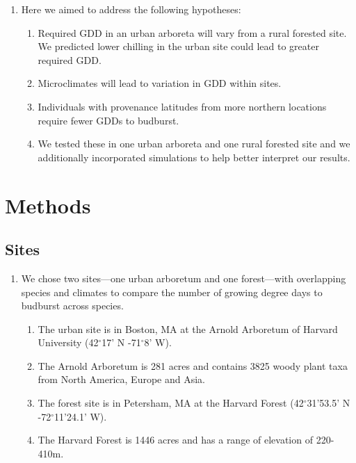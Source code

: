 \documentclass{article}\usepackage[]{graphicx}\usepackage[]{color}
\begin{document}
\begin{enumerate}
\item Here we aimed to address the following hypotheses:
  \begin{enumerate} 
  \item Required GDD in an urban arboreta will vary from a rural forested site. We predicted lower chilling in the urban site could lead to greater required GDD.
  \item Microclimates will lead to variation in GDD within sites. 
  \item Individuals with provenance latitudes from more northern locations require fewer GDDs to budburst. 
  \item We tested these in one urban arboreta and one rural forested site and we additionally incorporated simulations to help better interpret our results. 
  \end{enumerate}
\end{enumerate}

\section*{Methods}
\subsection*{Sites}
\begin{enumerate}
\item We chose two sites---one urban arboretum and one forest---with overlapping species and climates to compare the number of growing degree days to budburst across species. 
  \begin{enumerate}
  \item The urban site is in Boston, MA at the Arnold Arboretum of Harvard University (42$^{\circ}$17' N -71$^{\circ}$8' W).
  \item The Arnold Arboretum is 281 acres and contains 3825 woody plant taxa from North America, Europe and Asia.
  \item The forest site is in Petersham, MA at the Harvard Forest (42$^{\circ}$31'53.5' N -72$^{\circ}$11'24.1' W).
  \item The Harvard Forest is 1446 acres and has a range of elevation of 220-410m. 
  \end{enumerate}
\end{enumerate}
  
\end{document}
